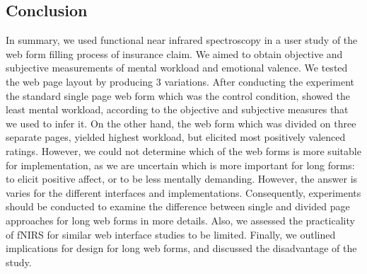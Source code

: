 \documentclass[../main/Replicate.tex]{subfiles}
\begin{document}
	\subsection{Conclusion}
	In summary, we used functional near infrared spectroscopy in a user study of the web form filling process of insurance claim. We aimed to obtain objective and subjective measurements of mental workload and emotional valence. We tested the web page layout by producing 3 variations. After conducting the experiment the standard single page web form which was the control condition, showed the least mental workload, according to the objective and subjective measures that we used to infer it. On the other hand, the web form which was divided on three separate pages, yielded highest workload, but elicited most positively valenced ratings. However, we could not determine which of the web forms is more suitable for implementation, as we are uncertain which is more important for long forms: to elicit positive affect, or to be less mentally demanding. However, the answer is varies for the different interfaces and implementations. Consequently, experiments should be conducted to examine the difference between single and divided page approaches for long web forms in more details. Also, we assessed the practicality of fNIRS for similar web interface studies to be limited.  Finally, we outlined implications for design for long web forms, and discussed the disadvantage of the study.
\end{document}
